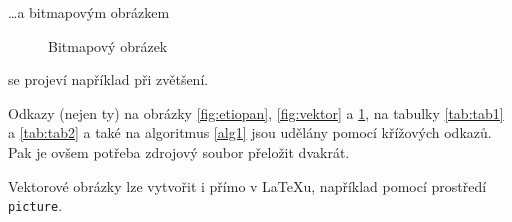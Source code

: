 \documentclass[11pt,a4paper]{article}
\begin{document}
\bigskip

\noindent\dots a bitmapovým obrázkem

\begin{figure}[h]
    \centering
    \caption{Bitmapový obrázek}
    \label{fig:bitmap}
\end{figure}
\bigskip

\noindent se projeví například při zvětšení.

\begin{NoHyper}
Odkazy (nejen ty) na obrázky \ref{fig:etiopan}, \ref{fig:vektor} a \ref{fig:bitmap}, na tabulky \ref{tab:tab1} a \ref{tab:tab2} a také na algoritmus \ref{alg1} jsou udělány pomocí křížových odkazů. Pak je ovšem potřeba zdrojový soubor přeložit dvakrát.
\end{NoHyper}

Vektorové obrázky lze vytvořit i přímo v \LaTeX u, například pomocí prostředí\texttt{ picture}.

\newpage
\end{document}
